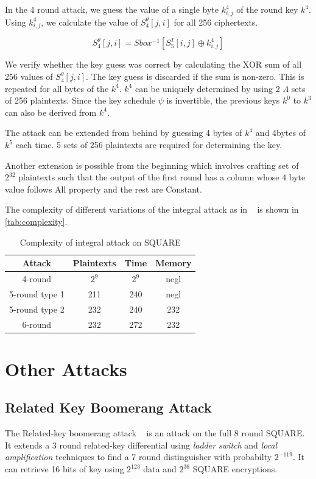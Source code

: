 \documentclass[preprint]{transcrypto}
\begin{document}
In the 4 round attack, we guess the value of a single byte $k_{i,j}^4$ of the round key $k^4$. Using $k_{i,j}^4$, we calculate the value of $S_4^\theta[j,i]$ for all 256 ciphertexts.

\begin{equation*}
  S_4^\theta[j,i] = Sbox^{-1}[S_5^I[i,j] \oplus k_{i,j}^4]
\end{equation*}

We verify whether the key guess was correct by calculating the XOR sum of all 256 values of $S_4^\theta[j,i]$. The key guess is discarded if the sum is non-zero. This is repeated for all bytes of the $k^4$. $k^4$ can be uniquely determined by using 2 $\Lambda$ sets of 256 plaintexts. Since the key schedule $\psi$ is invertible, the previous keys $k^0$ to $k^3$ can also be derived from $k^4$.

The attack can be extended from behind by guessing 4 bytes of $k^4$ and 4bytes of $k^5$ each time. 5 sets of 256 plaintexts are required for determining the key.

Another extension is possible from the beginning which involves crafting set of $2^32$ plaintexts such that the output of the first round has a column whose 4 byte value follows All property and the rest are Constant.

The complexity of different variations of the integral attack as in ~\cite{FSE:DaeKnuRij97} is shown in \autoref{tab:complexity}.

\begin{table}
  \centering
  \begin{tabular}{|c|c|c|c|}
    \hline
    Attack          & Plaintexts & Time  & Memory \\
    \hline
    4-round         & $2^9$      & $2^9$ & negl   \\
    5-round  type 1 & 211        & 240   & negl   \\
    5-round  type 2 & 232        & 240   & 232    \\
    6-round         & 232        & 272   & 232    \\
    \hline
  \end{tabular}

  \caption{Complexity of integral attack on SQUARE}
  \label{tab:complexity}
\end{table}

\section{Other Attacks}
\subsection{Related Key Boomerang Attack}
The Related-key boomerang attack ~\cite{EPRINT:KooYeoSon10} is an attack on the full 8 round SQUARE. It extends a 3 round related-key differential using \textit{ladder switch} and \textit{local amplification} techniques to find a 7 round distinguisher with probabilty $2^{-119}$. It can retrieve 16 bits of key using $2^{123}$ data and $2^{36}$ SQUARE encryptions.
\end{document}
